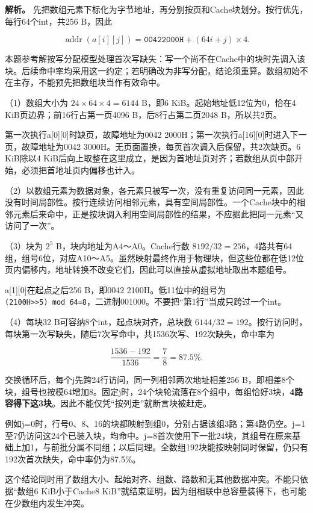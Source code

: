 
\textbf{解析。} 先把数组元素下标化为字节地址，再分别按页和Cache块划分。按行优先，每行64个int，共256 B，因此

\[
\operatorname{addr}(a[i][j])=\mathtt{00422000H}+(64i+j)\times4.
\]

本题参考解按写分配模型处理首次写缺失：写一个尚不在Cache中的块时先调入该块。后续命中率均采用这一约定；若明确改为非写分配，结论须重算。数组初始不在主存，不能预先把数组块当作有效命中。

（1）数组大小为 \(24\times64\times4=6144\) B，即6 KiB。起始地址低12位为0，恰在4 KiB页边界；前16行占第一页4096 B，后8行占第二页2048 B，所以共2页。

第一次执行a{[}0{]}{[}0{]}时缺页，故障地址为0042 2000H；第一次执行a{[}16{]}{[}0{]}时进入下一页，故障地址为0042 3000H。无页面置换，每页首次调入后保留，共2次缺页。6 KiB除以4 KiB后向上取整在这里成立，是因为首地址页对齐；若数组从页中部开始，必须把首地址页内偏移也计入。

（2）以数组元素为数据对象，各元素只被写一次，没有重复访问同一元素，因此没有时间局部性。按行连续访问相邻元素，具有空间局部性。一个Cache块中的相邻元素后来命中，正是按块调入利用空间局部性的结果，不应据此把同一元素``又访问了一次''。

（3）块为 \(2^5\) B，块内地址为A4～A0。Cache行数 \(8192/32=256\)，4路共有64组，组号6位，对应A10～A5。虽然映射最终作用于物理块，但这些位都在低12位页内偏移内，地址转换不改变它们，因此可以直接从虚拟地址取出本题组号。

a{[}1{]}{[}0{]}在起点之后256 B，即0042 2100H。低11位中的组号为 \allowbreak{}\texttt{(2100H\textgreater{}\textgreater{}5)\ mod\ 64=8}，二进制001000。不要把``第1行''当成只跨过一个int。

（4）每块32 B可容纳8个int，起点块对齐，总块数 \(6144/32=192\)。按行访问时，每块第一次写缺失，随后7次写命中，共1536次写、192次缺失，命中率为

\[
\frac{1536-192}{1536}=\frac78=87.5\%.
\]

交换循环后，每个j先跨24行访问，同一列相邻两次地址相差256 B，即相差8个块，组号也按模64增加8。固定j时，24个块轮流落在8个组中，每组恰好3块，\textbf{4路容得下这3块}。因此不能仅凭``按列走''就断言块被赶走。

例如j=0时，行号0、8、16的块都映射到组0，分别占据该组3路；第4路仍空。j=1至7仍访问这24个已装入块，均命中。j=8首次使用下一批24块，其组号在原来基础上加1，与前批分属不同组；以后同理。全数组192块能按映射同时保留，仍只有192次首次缺失，命中率仍为87.5\%。

这个结论同时用了数组大小、起始对齐、组数、路数和无其他数据冲突。不能只依据``数组6 KiB小于Cache8 KiB''就结束证明，因为组相联中总容量装得下，也可能在少数组内发生冲突。

